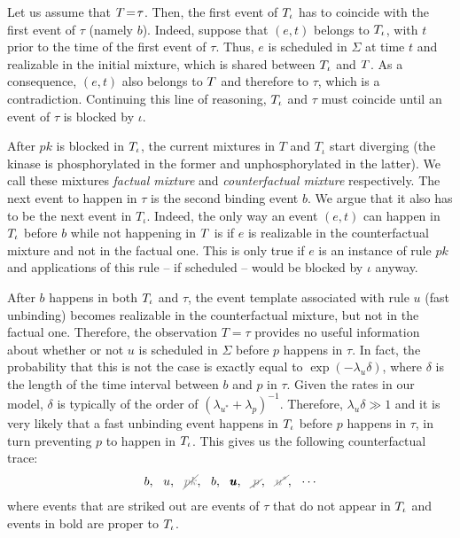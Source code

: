 Let us assume that $T \!=\! \tau$. Then, the first event of
$T_\iota$ has to coincide with the first event of $\tau$ (namely $b$).
Indeed, suppose that $(e, t)$ belongs to $T_\iota$, with $t$ prior to
the time of the first event of $\tau$. Thus, $e$ is scheduled in
$\Sigma$ at time $t$ and realizable in the initial mixture, which is
shared between $T_\iota$ and $T$. As a consequence, $(e, t)$
also belongs to $T$ and therefore to $\tau$, which is a
contradiction. Continuing this line of reasoning, $T_\iota$ and $\tau$
must coincide until an event of $\tau$ is blocked by $\iota$.

After $pk$ is blocked in $T_\iota$, the current mixtures in $T$ and
$T_\iota$ start diverging (the kinase is phosphorylated in the former
and unphosphorylated in the latter). We call these mixtures
\emph{factual mixture} and \emph{counterfactual mixture} respectively.
The next event to happen in $\tau$ is the second binding event $b$. We
argue that it also has to be the next event in $T_\iota$. Indeed, the
only way an event $(e, t)$ can happen in $T_\iota$ before $b$ while
not happening in $T$ is if $e$ is realizable in the
counterfactual mixture and not in the factual one. This is only true
if $e$ is an instance of rule $pk$ and applications of this rule -- if
scheduled -- would be blocked by $\iota$ anyway.

After $b$ happens in both $T_\iota$ and $\tau$, the event template
associated with rule $u$ (fast unbinding) becomes realizable in the
counterfactual mixture, but not in the factual one. Therefore, the
observation $T\!=\!\tau$ provides no useful information about whether
or not $u$ is scheduled in $\Sigma$ before $p$ happens in $\tau$. In
fact, the probability that this is not the case is exactly equal to
$\exp(-\lambda_u\delta)$, where $\delta$ is the length of the time
interval between $b$ and $p$ in $\tau$. Given the rates in our model,
$\delta$ is typically of the order of
$(\lambda_{u^*}+\lambda_p)^{-1}$. Therefore, $\lambda_u\delta \gg 1$
and it is very likely that a fast unbinding event happens in $T_\iota$
before $p$ happens in $\tau$, in turn preventing $p$ to happen in
$T_\iota$.  This gives us the following counterfactual trace:
\begin{align}
  \label{counterfactual-trace} 
  b,\ \ u,\ \ \strikeout{pk}, \ \ b, \ \ \pmb{u}, \ \ \strikeout{\,p\,}, 
  \ \ \strikeout{u^*}, \ \ \cdots
\end{align} 
where events that are striked out are events of $\tau$ that do not
appear in $T_\iota$ and events in bold are proper to $T_\iota$.


